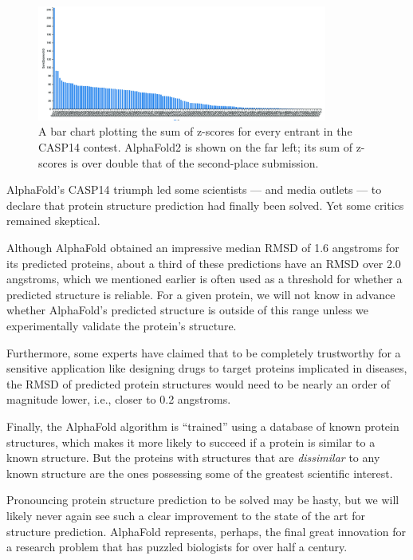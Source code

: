 \begin{figure}[h]
	\centering
	\mySfFamily
	\includegraphics[width = 0.85\textwidth]{../images_CMYK/CASP14_overall_results}
	\caption{A bar chart plotting the sum of z-scores for every entrant in the CASP14 contest. AlphaFold2 is shown on the far left; its sum of z-scores is over double that of the second-place submission.}
	\label{fig:CASP14_overall_results}
\end{figure}

AlphaFold's CASP14 triumph led some scientists --- and media outlets --- to declare that protein structure prediction had finally been solved. Yet some critics remained skeptical.

Although AlphaFold obtained an impressive median RMSD of 1.6 angstroms for its predicted proteins, about a third of these predictions have an RMSD over 2.0 angstroms, which we mentioned earlier is often used as a threshold for whether a predicted structure is reliable. For a given protein, we will not know in advance whether AlphaFold's predicted structure is outside of this range unless we experimentally validate the protein's structure.

Furthermore, some experts have claimed that to be completely trustworthy for a sensitive application like designing drugs to target proteins implicated in diseases, the RMSD of predicted protein structures would need to be nearly an order of magnitude lower, i.e., closer to 0.2 angstroms.

Finally, the AlphaFold algorithm is ``trained'' using a database of known protein structures, which makes it more likely to succeed if a protein is similar to a known structure. But the proteins with structures that are \textit{dissimilar} to any known structure are the ones possessing some of the greatest scientific interest.

Pronouncing protein structure prediction to be solved may be hasty, but we will likely never again see such a clear improvement to the state of the art for structure prediction. AlphaFold represents, perhaps, the final great innovation for a research problem that has puzzled biologists for over half a century.

